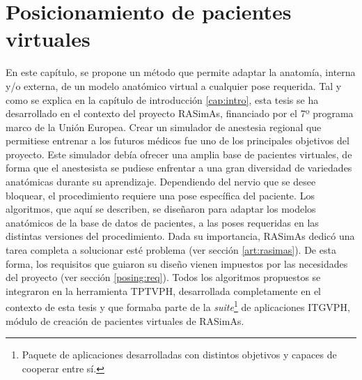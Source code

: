 \chapter{Posicionamiento de pacientes virtuales} 
\label{cap:posing}

En este capítulo, se propone un método que permite adaptar la anatomía, interna y/o externa, de un modelo anatómico virtual a cualquier pose requerida. Tal y como se explica en la capítulo de introducción \ref{cap:intro}, esta tesis se ha desarrollado en el contexto del proyecto \ac{RASimAs}, financiado por el 7º programa marco de la Unión Europea. Crear un simulador de anestesia regional que permitiese entrenar a los futuros médicos fue uno de los principales objetivos del proyecto. 
Este simulador debía ofrecer una amplia base de pacientes virtuales, de forma que el anestesista se pudiese enfrentar a una gran diversidad de variedades anatómicas durante su aprendizaje. Dependiendo del nervio que se desee bloquear, el procedimiento requiere una pose específica del paciente. Los algoritmos, que aquí se describen, se diseñaron para adaptar los modelos anatómicos de la base de datos de pacientes, a las poses requeridas en las distintas versiones del procedimiento. Dada su importancia, \ac{RASimAs} dedicó una tarea completa a solucionar esté problema (ver sección \ref{art:rasimas}). 
De esta forma, los requisitos que guiaron su diseño vienen impuestos por las necesidades del proyecto (ver sección \ref{posing:req}). Todos los algoritmos propuestos se integraron en la herramienta \ac{TPTVPH}, desarrollada completamente en el contexto de esta tesis y que formaba parte de la \emph{suite}\footnote{Paquete de aplicaciones desarrolladas con distintos objetivos y capaces de cooperar entre sí.} de aplicaciones \acl{ITGVPH}, módulo de creación de pacientes virtuales de  \ac{RASimAs}.



